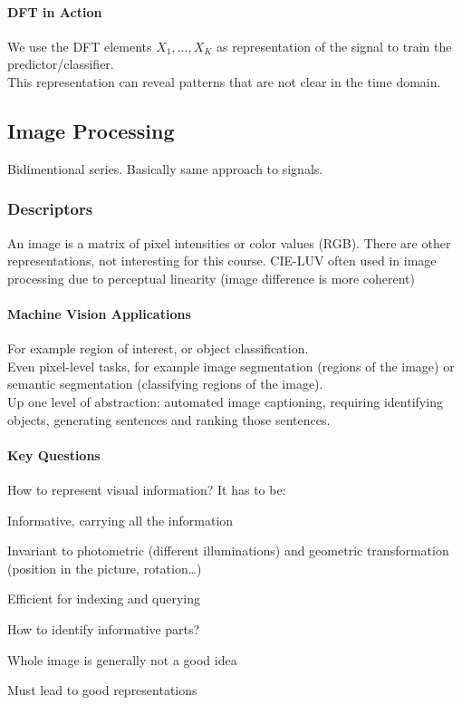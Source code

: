 \documentclass[10pt]{report}
\begin{document}
\paragraph{DFT in Action} We use the DFT elements $X_1,\ldots,X_K$ as representation of the signal to train the predictor/classifier.\\
This representation can reveal patterns that are not clear in the time domain.
\subsection{Image Processing}
Bidimentional series. Basically same approach to signals.
\subsubsection{Descriptors}
An image is a matrix of pixel intensities or color values (RGB). There are other representations, not interesting for this course. CIE-LUV often used in image processing due to perceptual linearity (image difference is more coherent)
\paragraph{Machine Vision Applications} For example region of interest, or object classification.\\
Even pixel-level tasks, for example image segmentation (regions of the image) or semantic segmentation (classifying regions of the image).\\
Up one level of abstraction: automated image captioning, requiring identifying objects, generating sentences and ranking those sentences.
\paragraph{Key Questions}
\begin{list}{}{}
	\item How to represent visual information? It has to be:\begin{list}{}{}
		\item Informative, carrying all the information
		\item Invariant to photometric (different illuminations) and geometric transformation (position in the picture, rotation\ldots)
		\item Efficient for indexing and querying
	\end{list}
	\item How to identify informative parts?\begin{list}{}{}
		\item Whole image is generally not a good idea
		\item Must lead to good representations
	\end{list}
\end{list}
\end{document}
